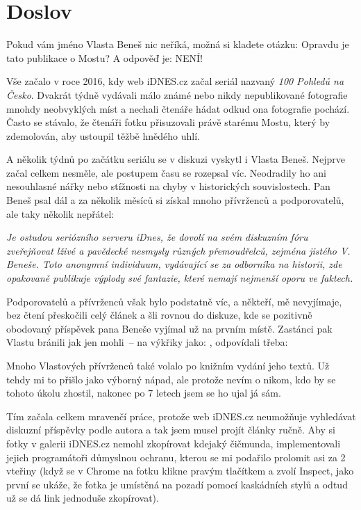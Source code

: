 \chapter{Doslov}

Pokud vám jméno Vlasta Beneš nic neříká, možná si kladete otázku: Opravdu je
tato publikace o Mostu? A odpověď je: NENÍ!

Vše začalo v roce 2016, kdy web iDNES.cz začal seriál nazvaný {\em 100 Pohledů
na Česko}. Dvakrát týdně vydávali málo známé nebo nikdy nepublikované
fotografie mnohdy neobvyklých míst a nechali čtenáře hádat odkud ona fotografie
pochází. Často se stávalo, že čtenáři fotku přisuzovali právě starému Mostu,
který by zdemolován, aby ustoupil těžbě hnědého uhlí.

A několik týdnů po začátku seriálu se v diskuzi vyskytl i Vlasta Beneš. Nejprve
začal celkem nesměle, ale postupem času se rozepsal víc. Neodradily ho ani
nesouhlasné nářky  nebo stížnosti na chyby v historických souvislostech. Pan
Beneš psal dál a za několik měsíců si získal mnoho přívrženců a podporovatelů,
ale taky několik nepřátel:

{\it Je ostudou seriózního serveru iDnes, že dovolí na svém diskuzním fóru
zveřejňovat lživé a pavědecké nesmysly různých přemoudřelců, zejména jistého V.
Beneše. Toto anonymní individuum, vydávající se za odborníka na historii, zde
opakovaně publikuje výplody své fantazie, které nemají nejmenší oporu ve
faktech.}

Podporovatelů a přívrženců však bylo podstatně víc, a někteří, mě nevyjímaje,
bez čtení přeskočili celý článek a šli rovnou do diskuze, kde se pozitivně
obodovaný příspěvek pana Beneše vyjímal už na prvním místě. Zastánci pak Vlastu
bránili jak jen mohli~-- na výkřiky jako: , odpovídali třeba: 

Mnoho Vlastových přívrženců také volalo po knižním vydání jeho textů. Už tehdy
mi to přišlo jako výborný nápad, ale protože nevím o nikom, kdo by se tohoto
úkolu zhostil, nakonec po 7 letech jsem se ho ujal já sám.

Tím začala celkem mravenčí práce, protože web iDNES.cz neumožňuje vyhledávat
diskuzní příspěvky podle autora a tak jsem musel projít články ručně. Aby si
fotky v galerii iDNES.cz nemohl zkopírovat kdejaký čičmunda, implementovali
jejich programátoři důmyslnou ochranu, kterou se mi podařilo prolomit asi za 2
vteřiny (když se v Chrome na fotku klikne pravým tlačítkem a zvolí Inspect,
jako první se ukáže, že fotka je umístěná na pozadí pomocí kaskádních stylů a
odtud už se dá link jednoduše zkopírovat).

